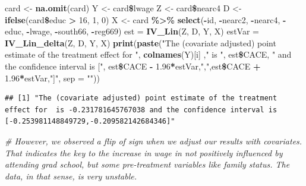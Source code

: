 \documentclass[]{article}
\newenvironment{Shaded}{\begin{snugshade}}{\end{snugshade}}
\newcommand{\KeywordTok}[1]{\textcolor[rgb]{0.13,0.29,0.53}{\textbf{#1}}}
\newcommand{\DataTypeTok}[1]{\textcolor[rgb]{0.13,0.29,0.53}{#1}}
\newcommand{\DecValTok}[1]{\textcolor[rgb]{0.00,0.00,0.81}{#1}}
\newcommand{\FloatTok}[1]{\textcolor[rgb]{0.00,0.00,0.81}{#1}}
\newcommand{\StringTok}[1]{\textcolor[rgb]{0.31,0.60,0.02}{#1}}
\newcommand{\CommentTok}[1]{\textcolor[rgb]{0.56,0.35,0.01}{\textit{#1}}}
\newcommand{\OperatorTok}[1]{\textcolor[rgb]{0.81,0.36,0.00}{\textbf{#1}}}
\newcommand{\NormalTok}[1]{#1}
\begin{document}
\begin{Shaded}
\begin{Highlighting}[]
\NormalTok{card <-}\StringTok{ }\KeywordTok{na.omit}\NormalTok{(card)}
\NormalTok{Y <-}\StringTok{ }\NormalTok{card}\OperatorTok{\$}\NormalTok{lwage}
\NormalTok{Z <-}\StringTok{ }\NormalTok{card}\OperatorTok{\$}\NormalTok{nearc4}
\NormalTok{D <-}\StringTok{ }\KeywordTok{ifelse}\NormalTok{(card}\OperatorTok{\$}\NormalTok{educ }\OperatorTok{>}\StringTok{ }\DecValTok{16}\NormalTok{, }\DecValTok{1}\NormalTok{, }\DecValTok{0}\NormalTok{)}
\NormalTok{X <-}\StringTok{ }\NormalTok{card }\OperatorTok{\%>\%}\StringTok{ }\KeywordTok{select}\NormalTok{(}\OperatorTok{-}\NormalTok{id, }\OperatorTok{-}\NormalTok{nearc2, }\OperatorTok{-}\NormalTok{nearc4, }\OperatorTok{-}\NormalTok{educ, }\OperatorTok{-}\NormalTok{lwage, }\OperatorTok{-}\NormalTok{south66, }\OperatorTok{-}\NormalTok{reg669)}
\NormalTok{est =}\StringTok{ }\KeywordTok{IV_Lin}\NormalTok{(Z, D, Y, X)}
\NormalTok{estVar =}\StringTok{ }\KeywordTok{IV_Lin_delta}\NormalTok{(Z, D, Y, X)}
\KeywordTok{print}\NormalTok{(}\KeywordTok{paste}\NormalTok{(}\StringTok{"The (covariate adjusted) point estimate of the treatment effect for "}\NormalTok{, }\KeywordTok{colnames}\NormalTok{(Y)[i] ,}\StringTok{" is "}\NormalTok{, est}\OperatorTok{\$}\NormalTok{CACE, }\StringTok{" and the confidence interval is ["}\NormalTok{, est}\OperatorTok{\$}\NormalTok{CACE }\OperatorTok{-}\StringTok{ }\FloatTok{1.96}\OperatorTok{*}\NormalTok{estVar,}\StringTok{","}\NormalTok{,est}\OperatorTok{\$}\NormalTok{CACE }\OperatorTok{+}\StringTok{ }\FloatTok{1.96}\OperatorTok{*}\NormalTok{estVar,}\StringTok{"]"}\NormalTok{, }\DataTypeTok{sep =} \StringTok{""}\NormalTok{))}
\end{Highlighting}
\end{Shaded}

\begin{verbatim}
## [1] "The (covariate adjusted) point estimate of the treatment effect for  is -0.231781645767038 and the confidence interval is [-0.253981148849729,-0.209582142684346]"
\end{verbatim}

\begin{Shaded}
\begin{Highlighting}[]
\CommentTok{# However, we observed a flip of sign when we adjust our results with covariates. That indicates the key to the increase in wage in not positively influenced by attending grad school, but some pre-treatment variables like family status. The data, in that sense, is very unstable.}
\end{Highlighting}
\end{Shaded}
\end{document}

